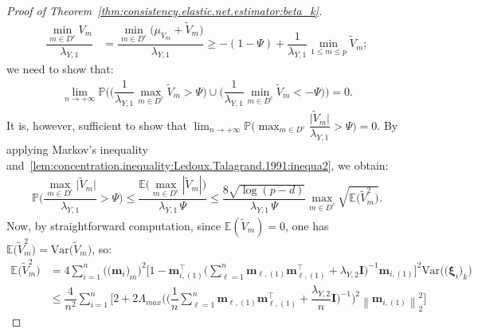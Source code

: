 \documentclass[
  12pt]{article}
\def\E{\mathbb{E}}
\def\M{\mathbf{m}}
\begin{document}
\begin{proof}[Proof of Theorem~\ref{thm:consistency.elastic.net.estimator:beta_k}]
\begin{align*}
		\dfrac{\min_{m \in D^{c}} V_{m} }{\lambda_{Y,1}}  &=   \dfrac{ \min_{m \in D^{c}} \Big( \mu_{V_m} + \widetilde{V}_{m} \Big) }{\lambda_{Y,1}}  \geq  - (1-\Psi) + \dfrac{1}{\lambda_{Y,1}}  \min_{1 \leq m \leq p} \widetilde{V}_{m};     
	\end{align*}    
	we need to show that:  
	\begin{align*}
		\lim_{n   \rightarrow   +\infty}  \mathbb{P} \Bigg( \Big( \dfrac{1}{\lambda_{Y,1}} \max_{m \in D^{c}} \widetilde{V}_{m}  > \Psi  \Big)  \cup   \Big( \dfrac{1}{\lambda_{Y,1}} \min_{m \in D^{c}} \widetilde{V}_{m}  <  - \Psi  \Big) \Bigg)  =  0  .  
	\end{align*}
	It is, however, sufficient to show that  $\displaystyle{  \lim_{n   \rightarrow   +\infty}  \mathbb{P} \Big( \max_{m \in D^{c}}   \dfrac{ \big|  \widetilde{V}_{m}   \big|  }{ \lambda_{Y,1} }   > \Psi  \Big)  =  0}$. By applying Markov's inequality and~\eqref{lem:concentration.inequality:Ledoux.Talagrand.1991:inequa2}, we obtain: 
	\begin{align*}
		\mathbb{P} \Bigg(    \dfrac{ \displaystyle{  \max_{m \in D^{c}} }   \big|   \widetilde{V}_{m}   \big| }{ \lambda_{Y,1} }  > \Psi  \Bigg)  \leq  \dfrac{ \mathbb{E} \Big( \displaystyle{  \max_{m \in D^{c}}  }  |\widetilde{V}_{m}| \Big) }{ \lambda_{Y,1} \, \Psi }   \leq   \dfrac{ 8 \sqrt{ \log(p - d) } }{ \lambda_{Y,1} \,  \Psi }  \max_{m \in D^{c}} \sqrt{ \mathbb{E} \big( \widetilde{V}_{m}^{2}   \big)  } .  
	\end{align*}   
	Now, by straightforward computation, since $\E(\widetilde{V}_{m}) = 0$, one has $\mathbb{E} \big(  \widetilde{V}_{m}^{2}  \big) =  \textrm{Var} \big(   \widetilde{V}_{m} \big)$, so: 
	\begin{align*}  
		\mathbb{E} \big(  \widetilde{V}_{m}^{2}  \big)  
		&=   4   \sum_{i=1}^{n}        \Big( \big( \M_{i} \big)_{m} \Big)^{2}    \Big[  1 -  \M_{i,(1)}^{\top}  \Big(  \sum_{\ell = 1}^{n}    \M_{\ell,(1)}    \M_{\ell,(1)}^{\top}  + \lambda_{Y,2} \mathbf{I}  \Big)^{-1} \M_{i,(1)}  \Big]^{2}    \textrm{Var} \Big(   \big( \bm{\xi}_{i} \big)_{k}   \Big) 
		\\ 
		&\leq  \dfrac{4}{n^{2}} \sum_{i=1}^{n}       \Big[ 2  +  2 \Lambda_{max}  \Big(  \Big( \dfrac{1}{n} \sum_{\ell = 1}^{n}    \M_{\ell,(1)}    \M_{\ell,(1)}^{\top}  + \dfrac{ \lambda_{Y,2} }{n} \mathbf{I}  \Big)^{-1} \Big)^{2} \left\| \M_{i,(1)} \right\|_{2}^{2} \Big]

\end{align*}
\end{proof}
\end{document}
